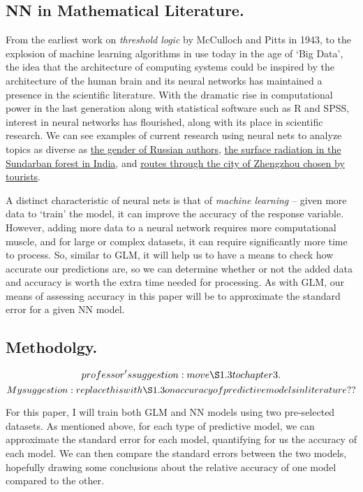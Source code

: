 \documentclass[12pt]{article}
\begin{document}
	\subsection{NN in Mathematical Literature.}
		From the earliest work on \textit{threshold logic} by McCulloch and Pitts in 1943, to the explosion of machine learning algorithms
in use today in the age of `Big Data', the idea that the architecture of computing systems could be inspired by the architecture of the human brain
and its neural networks has maintained a presence in the scientific literature.  With the dramatic rise in computational power in the last 
generation along with statistical software such as R and SPSS, interest in neural networks has flourished, along with its place in scientific
research.  We can see examples of current research using neural nets to analyze topics as diverse as 
\href{https://www.sciencedirect.com/science/article/pii/S1877050918300656}{the gender of Russian authors},
\href{https://www.sciencedirect.com/science/article/pii/S2468203916300024}{the surface radiation in the Sundarban forest in India}, and 
\href{https://www.sciencedirect.com/science/article/pii/S1877050917303617}{routes through the city of Zhengzhou chosen by tourists}.
		
A distinct characteristic of neural nets is that of \textit{machine learning} -- given more data to `train' the model, it can improve the accuracy
of the response variable.  However, adding more data to a neural network requires more computational muscle, and for large or complex datasets,
it can require significantly more time to process.  So, similar to GLM, it will help us to have a means to check how accurate our predictions are,
so we can determine whether or not the added data and accuracy is worth the extra time needed for processing.  As with GLM, our means of assessing
accuracy in this paper will be to approximate the standard error for a given NN model.



	\subsection{Methodolgy.}

	$$professor's suggestion:  move \S 1.3 to chapter 3.$$
$$My suggestion:  replace this with \S1.3 on accuracy of predictive models in literature??$$

		For this paper, I will train both GLM and NN models using two pre-selected datasets.  As mentioned above, for each type of
predictive model, we can approximate the standard error for each model, quantifying for us the accuracy of each model.  We can then compare the 
standard errors between the two models, hopefully drawing some conclusions about the relative accuracy of one model compared to the other.
\end{document}

